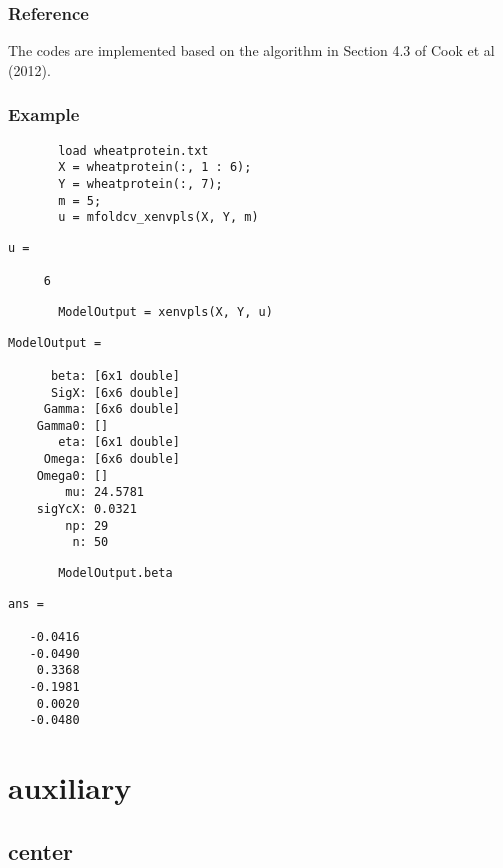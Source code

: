 \documentclass[a4paper,11pt,openany]{memoir}
\begin{document}
\subsection*{Reference}

\begin{par}
The codes are implemented based on the algorithm in Section 4.3 of Cook et al (2012).
\end{par} \vspace{1em}


\subsection*{Example}


\begin{verbatim}       load wheatprotein.txt
       X = wheatprotein(:, 1 : 6);
       Y = wheatprotein(:, 7);
       m = 5;
       u = mfoldcv_xenvpls(X, Y, m)\end{verbatim}
        \color{lightgray} \ttfamily\begin{verbatim}
u =

     6
\end{verbatim}\rmfamily
 \color{black}
\begin{verbatim}       ModelOutput = xenvpls(X, Y, u)\end{verbatim}
        \color{lightgray}\ttfamily \begin{verbatim}
ModelOutput = 

      beta: [6x1 double]
      SigX: [6x6 double]
     Gamma: [6x6 double]
    Gamma0: []
       eta: [6x1 double]
     Omega: [6x6 double]
    Omega0: []
        mu: 24.5781
    sigYcX: 0.0321
        np: 29
         n: 50
\end{verbatim}\rmfamily
 \color{black}

\begin{verbatim}       ModelOutput.beta\end{verbatim}    
        \color{lightgray}\ttfamily \begin{verbatim}
ans =

   -0.0416
   -0.0490
    0.3368
   -0.1981
    0.0020
   -0.0480

\end{verbatim}\rmfamily \color{black}
\newpage

\chapter{auxiliary}

    
\rmfamily
\color{black}\section{center}
\end{document}
